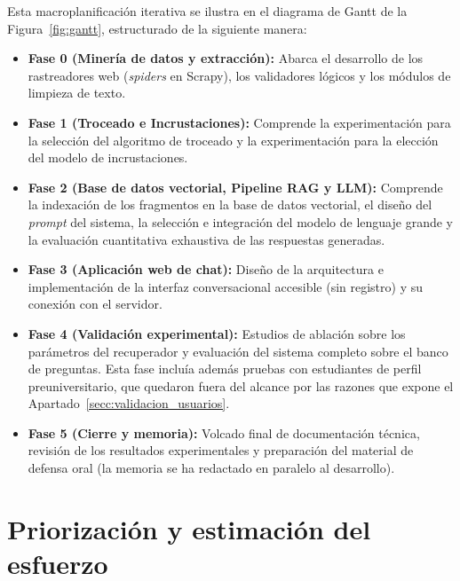 Esta macroplanificación iterativa se ilustra en el diagrama de Gantt de la Figura~\ref{fig:gantt}, estructurado de la siguiente manera:
\begin{itemize}                                                                                                                                                    
  \item \textbf{Fase 0 (Minería de datos y extracción):} Abarca el desarrollo de los rastreadores web (\textit{spiders} en Scrapy), los validadores lógicos y los módulos de limpieza de texto.
        
  \item \textbf{Fase 1 (Troceado e Incrustaciones):} Comprende la experimentación para la selección del algoritmo de troceado y la experimentación para la elección del modelo de incrustaciones.
        
  \item \textbf{Fase 2 (Base de datos vectorial, Pipeline RAG y LLM):} Comprende la indexación de los fragmentos en la base de datos vectorial, el diseño del \textit{prompt} del sistema, la selección e integración del modelo de lenguaje grande y la evaluación cuantitativa exhaustiva de las respuestas generadas.
        
  \item \textbf{Fase 3 (Aplicación web de chat):} Diseño de la arquitectura e implementación de la interfaz conversacional accesible (sin registro) y su conexión con el servidor.
        
  \item \textbf{Fase 4 (Validación experimental):} Estudios de ablación sobre los
        parámetros del recuperador y evaluación del sistema completo sobre el banco de
        preguntas. Esta fase incluía además pruebas con estudiantes de perfil
        preuniversitario, que quedaron fuera del alcance por las razones que expone el
        Apartado~\ref{secc:validacion_usuarios}.
        
  \item \textbf{Fase 5 (Cierre y memoria):} Volcado final de documentación técnica, revisión de los resultados experimentales y preparación del material de defensa oral (la memoria se ha redactado en paralelo al desarrollo).
        
\end{itemize}




\section{Priorización y estimación del esfuerzo}

